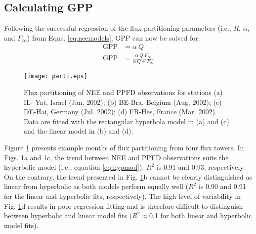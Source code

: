 \subsection{Calculating GPP}
\label{sec:calcgpp}
Following the successful regression of the flux partitioning parameters (i.e., $R$, $\alpha$, and $F_\infty$) from Eqns. \ref{eq:neemodels}, GPP can now be solved for:
\begin{subequations}
\label{eq:gppmod}
\begin{align}
    \text{GPP} &= \alpha\: Q \label{eq:gppl}\\
    \text{GPP} &= \frac{\alpha\: Q\: F_{\infty}}
                       {\alpha\: Q + F_{\infty}} \label{eq:gpph}
\end{align}
\end{subequations}
\begin{figure}[h!]
    \texttt{[image: parti.eps]}
    \caption{Flux partitioning of NEE and PPFD observations for stations (a) IL-
    Yat, Israel (Jan. 2002); (b) BE-Bra, Belgium (Aug. 2002); (c) DE-Hai, 
    Germany (Jul. 2002); (d) FR-Hes, France (Mar. 2002).  Data are fitted with 
    the rectangular hyperbola model in (a) and (c) and the linear model in (b) 
    and (d). }
    \label{fig:parti}
\end{figure}

Figure \ref{fig:parti} presents example months of flux partitioning from four flux towers.  
In Figs. \ref{fig:parti}a and \ref{fig:parti}c, the trend between NEE and PPFD observations suits the hyperbolic model (i.e., equation \ref{eq:hypmod}), $R^{2}$ is 0.91 and 0.93, respectively. 
On the contrary, the trend presented in Fig. \ref{fig:parti}b cannot be clearly distinguished as linear from hyperbolic as both models perform equally well ($R^{2}$ is 0.90 and 0.91 for the linear and hyperbolic fits, respectively). 
The high level of variability in Fig. \ref{fig:parti}d results in poor regression fitting and is therefore difficult to distinguish between hyperbolic and linear model fits ($R^{2}\approx$0.1 for both linear and hyperbolic model fits).

